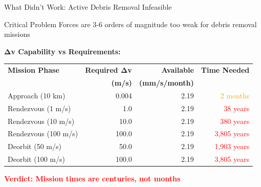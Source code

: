 \documentclass[aspectratio=169]{beamer}
\begin{document}
\begin{frame}{What Didn't Work: Active Debris Removal Infeasible}
\begin{block}{Critical Problem}
Forces are 3-6 orders of magnitude too weak for debris removal missions
\end{block}

\vspace{0.5em}
\textbf{Δv Capability vs Requirements:}

\begin{table}
\footnotesize
\begin{tabular}{lrrr}
\toprule
\textbf{Mission Phase} & \textbf{Required Δv} & \textbf{Available} & \textbf{Time Needed} \\
 & \textbf{(m/s)} & \textbf{(mm/s/month)} & \\
\midrule
Approach (10 km) & 0.004 & 2.19 & \textcolor{orange}{2 months} \\
Rendezvous (1 m/s) & 1.0 & 2.19 & \textcolor{red}{38 years} \\
Rendezvous (10 m/s) & 10.0 & 2.19 & \textcolor{red}{380 years} \\
Rendezvous (100 m/s) & 100.0 & 2.19 & \textcolor{red}{3,805 years} \\
Deorbit (50 m/s) & 50.0 & 2.19 & \textcolor{red}{1,903 years} \\
Deorbit (100 m/s) & 100.0 & 2.19 & \textcolor{red}{3,805 years} \\
\bottomrule
\end{tabular}
\end{table}

\vspace{0.5em}
\begin{center}
\textcolor{red}{\textbf{Verdict: Mission times are centuries, not months}}
\end{center}
\end{frame}
\end{document}

